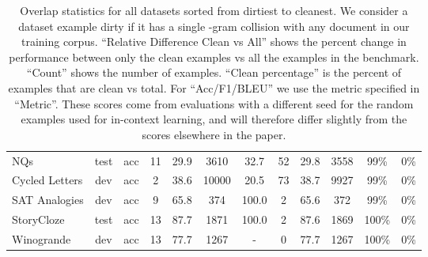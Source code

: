 \documentclass{article}
\begin{document}
\begin{table}
{\begin{adjustwidth}{-1.4in}{-1.4in}
\begin{center}
\begin{tabular}{lccccccccccc}
                 NQs &  test &      acc &  11 &        29.9 &                      3610 &                            32.7 &                        52 &                            29.8 &                      3558 &                            99\% &                                                 0\% \\
      Cycled Letters &   dev &      acc &   2 &        38.6 &                     10000 &                            20.5 &                        73 &                            38.7 &                      9927 &                            99\% &                                                 0\% \\
       SAT Analogies &   dev &      acc &   9 &        65.8 &                       374 &                           100.0 &                         2 &                            65.6 &                       372 &                            99\% &                                                 0\% \\
          StoryCloze &  test &      acc &  13 &        87.7 &                      1871 &                           100.0 &                         2 &                            87.6 &                      1869 &                           100\% &                                                 0\% \\
          Winogrande &   dev &      acc &  13 &        77.7 &                      1267 &                               - &                         0 &                            77.7 &                      1267 &                           100\% &                                                 0\% \\

\bottomrule
\end{tabular}
    
    
    
    
    
    \end{center}
    \end{adjustwidth}
    }
    
        \caption{Overlap statistics for all datasets sorted from dirtiest to cleanest. We consider a dataset example dirty if it has a single -gram collision with any document in our training corpus. ``Relative Difference Clean vs All'' shows the percent change in performance between only the clean examples vs all the examples in the benchmark. ``Count'' shows the number of examples. ``Clean percentage'' is the percent of examples that are clean vs total. For ``Acc/F1/BLEU'' we use the metric specified in ``Metric''. These scores come from evaluations with a different seed for the random examples used for in-context learning, and will therefore differ slightly from the scores elsewhere in the paper. }
        \label{table:overlap_master}
    \end{table} 
\end{document}
